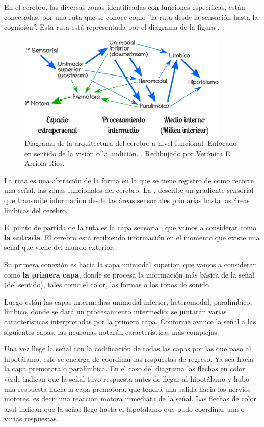 En el cerebro, las diversas zonas identificadas con funciones específicas, están conectadas, por una ruta que se conoce como 
 ''la ruta desde la sensación hasta la cognición''. Esta ruta está representada por el diagrama de la figura . \parencite{sensAcogn}
 
 \begin{figure}[h]
  \centering
  \includegraphics[width=0.9\textwidth]{../Figuras/zonasFuncionales.png}
  \caption{Diagrama de la arquitectura del cerebro a nivel funcional. Enfocado en sentido de la visión o la audición. \parencite{Mesulam1998}. Redibujado por Verónica E. Arriola Ríos. }
  \label{fig:zonasFun}
 \end{figure}

La ruta es una abtración de la forma en la que se tiene registro de como recorre una señal, las zonas funcionales del cerebro. 
La , describe un gradiente sensorial que transmite información desde las áreas sensoriales primarias hasta las áreas límbicas del cerebro.

El punto de partida de la ruta es la capa sensorial, que vamos a considerar como \textbf{la entrada}. El cerebro está recibiendo información en el momento que existe una señal que viene del mundo exterior.

Su primera conexión es hacia la capa unimodal superior, que vamos a considerar como \textbf{la primera capa}, donde se procesa la información más básica de la señal (del sentido), tales como el color, las formas o los tonos de sonido.

Luego están las capas intermedias unimodal inferior, heteromodal, paralímbico, límbico, donde se dará un procesamiento intermedio; se juntarán varias características interpretadas por la primera capa. Conforme avance la señal a las siguientes capas, las neuronas notarán características más complejas. 

Una vez llege la señal con la codificación de todas las capas por las que paso al hipotálamo, este se encarga de coordinar las respuestas de regreso. Ya sea hacia la capa premotora o paralímbica. En el caso del diagrama las flechas en color verde indican que la señal tuvo respuesta antes de llegar al hipotálamo y hubo una respuesta hacia la capa premotora, que tendrá una salida hacia los nervios motores, es decir una reacción motora inmediata de la señal. Las flechas de color azul indican que la señal llego hasta el hipotálamo que pudo coordinar una o varias respuestas. 

